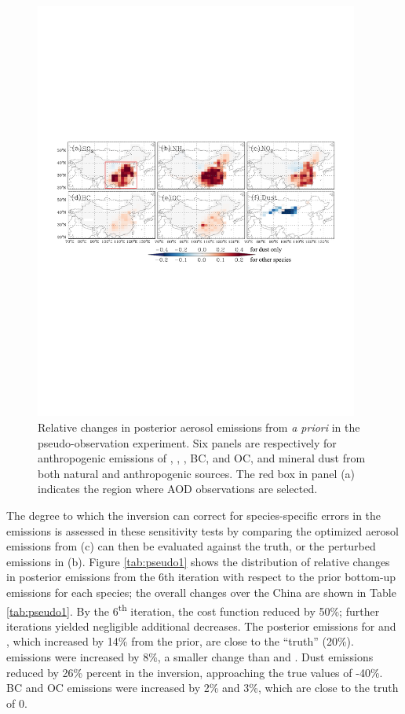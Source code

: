 \begin{figure}[t]  \centering  \includegraphics[width={0.95\textwidth}]{figures/a2.pdf}
  \caption{Relative changes in posterior aerosol emissions from \textit{a priori}
   in the pseudo-observation experiment.
   Six panels are respectively for anthropogenic emissions of , ,
   , BC, and OC, and mineral dust from both natural and anthropogenic sources.
   The red box in panel (a) indicates the region where AOD observations are selected. }
  \label{fig:pseudo1}
 \end{figure}

 The degree to which the inversion can correct for species-specific errors in the emissions 
 is assessed in these sensitivity tests by comparing the optimized aerosol emissions 
 from (c) can then be evaluated against the truth, or the perturbed emissions in (b).  
 Figure \ref{tab:pseudo1} shows the distribution of relative changes in posterior emissions 
 from the 6th iteration with respect to the prior bottom-up emissions for each species; 
 the overall changes over the China are shown in Table \ref{tab:pseudo1}.
 By the 6\textsuperscript{th} iteration, the cost function reduced by 50\%; 
 further iterations yielded negligible additional decreases. 
 The posterior emissions for  and , which increased by 14\% from the prior, 
 are close to the “truth” (20\%).  emissions were increased by 8\%, 
 a smaller change than  and . 
 Dust emissions reduced by 26\% percent in the inversion, 
 approaching the true values of -40\%.
 BC and OC emissions were increased by 2\% and 3\%, which are close to the truth of 0. 

